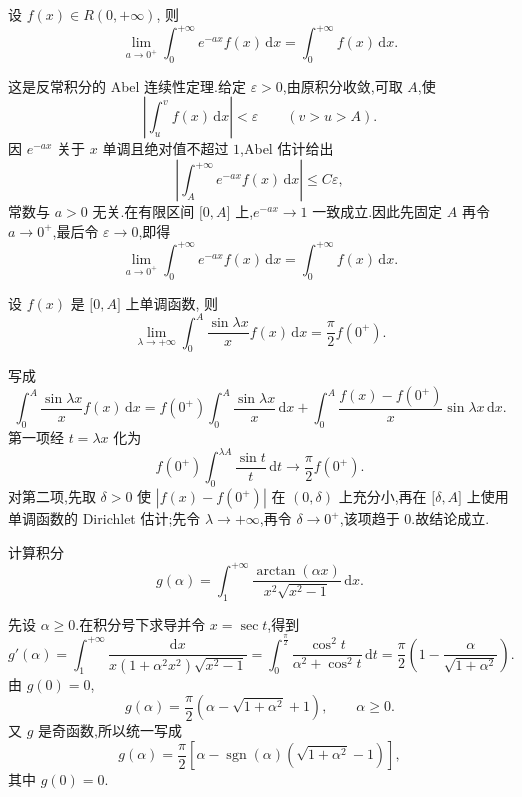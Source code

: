 \begin{example}
    设 $f(x)\in R(0,+\infty)$, 则
    \[
        \lim\limits_{a\to0^+}\int_0^{+\infty}e^{-ax}f(x)\,\mathrm{d}x
        =\int_0^{+\infty}f(x)\,\mathrm{d}x.
    \]
\end{example}
\exampleblank

\begin{solution}
    这是反常积分的 Abel 连续性定理.给定 $\varepsilon>0$,由原积分收敛,可取 $A$,使
    \[
        \left|\int_u^v f(x)\,\mathrm{d}x\right|<\varepsilon
        \qquad(v>u>A).
    \]
    因 $e^{-ax}$ 关于 $x$ 单调且绝对值不超过 $1$,Abel 估计给出
    \[
        \left|\int_A^{+\infty}e^{-ax}f(x)\,\mathrm{d}x\right|\leq C\varepsilon,
    \]
    常数与 $a>0$ 无关.在有限区间 $\lbrack0,A\rbrack$ 上,$e^{-ax}\to1$ 一致成立.因此先固定 $A$ 再令 $a\to0^+$,最后令 $\varepsilon\to0$,即得
    \[
        \lim\limits_{a\to0^+}\int_0^{+\infty}e^{-ax}f(x)\,\mathrm{d}x
        =\int_0^{+\infty}f(x)\,\mathrm{d}x.
    \]
\end{solution}

\begin{example}[\markstar]
    设 $f(x)$ 是 $\lbrack0,A\rbrack$ 上单调函数, 则
    \[
        \lim\limits_{\lambda\to+\infty}\int_0^A\dfrac{\sin\lambda x}{x}f(x)\,\mathrm{d}x
        =\dfrac{\pi}{2}f(0^+).
    \]
\end{example}
\exampleblank

\begin{solution}
    写成
    \[
        \int_0^A\dfrac{\sin\lambda x}{x}f(x)\,\mathrm{d}x
        =f(0^+)\int_0^A\dfrac{\sin\lambda x}{x}\,\mathrm{d}x
        +\int_0^A\dfrac{f(x)-f(0^+)}{x}\sin\lambda x\,\mathrm{d}x.
    \]
    第一项经 $t=\lambda x$ 化为
    \[
        f(0^+)\int_0^{\lambda A}\dfrac{\sin t}{t}\,\mathrm{d}t
        \longrightarrow\dfrac{\pi}{2}f(0^+).
    \]
    对第二项,先取 $\delta>0$ 使 $|f(x)-f(0^+)|$ 在 $(0,\delta)$ 上充分小,再在
    $\lbrack\delta,A\rbrack$ 上使用单调函数的 Dirichlet 估计;先令 $\lambda\to+\infty$,再令 $\delta\to0^+$,该项趋于 $0$.故结论成立.
\end{solution}

\begin{example}
    计算积分
    \[
        g(\alpha)=\int_1^{+\infty}\dfrac{\arctan(\alpha x)}{x^2\sqrt{x^2-1}}\,\mathrm{d}x.
    \]
\end{example}
\exampleblank

\begin{solution}
    先设 $\alpha\geq0$.在积分号下求导并令 $x=\sec t$,得到
    \[
        g'(\alpha)=\int_1^{+\infty}\dfrac{\mathrm{d}x}{x(1+\alpha^2x^2)\sqrt{x^2-1}}
        =\int_0^{\frac{\pi}{2}}\dfrac{\cos^2t}{\alpha^2+\cos^2t}\,\mathrm{d}t
        =\dfrac{\pi}{2}\left(1-\dfrac{\alpha}{\sqrt{1+\alpha^2}}\right).
    \]
    由 $g(0)=0$,
    \[
        g(\alpha)=\dfrac{\pi}{2}\left(\alpha-\sqrt{1+\alpha^2}+1\right),
        \qquad \alpha\geq0.
    \]
    又 $g$ 是奇函数,所以统一写成
    \[
        g(\alpha)=\dfrac{\pi}{2}\left[\alpha-\operatorname{sgn}(\alpha)
            \left(\sqrt{1+\alpha^2}-1\right)\right],
    \]
    其中 $g(0)=0$.
\end{solution}

